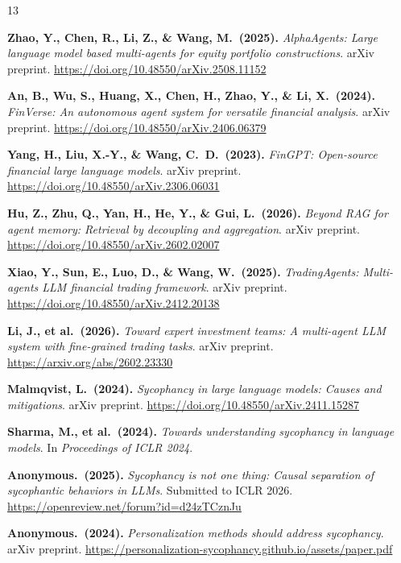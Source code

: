 \documentclass[11pt,a4paper]{article}
\begin{document}
\begin{thebibliography}{13}

\textbf{Zhao, Y., Chen, R., Li, Z., \& Wang, M.\ (2025).}
\textit{AlphaAgents: Large language model based multi-agents for equity portfolio constructions}.
arXiv preprint. \url{https://doi.org/10.48550/arXiv.2508.11152}

\textbf{An, B., Wu, S., Huang, X., Chen, H., Zhao, Y., \& Li, X.\ (2024).}
\textit{FinVerse: An autonomous agent system for versatile financial analysis}.
arXiv preprint. \url{https://doi.org/10.48550/arXiv.2406.06379}

\textbf{Yang, H., Liu, X.-Y., \& Wang, C.~D.\ (2023).}
\textit{FinGPT: Open-source financial large language models}.
arXiv preprint. \url{https://doi.org/10.48550/arXiv.2306.06031}

\textbf{Hu, Z., Zhu, Q., Yan, H., He, Y., \& Gui, L.\ (2026).}
\textit{Beyond RAG for agent memory: Retrieval by decoupling and aggregation}.
arXiv preprint. \url{https://doi.org/10.48550/arXiv.2602.02007}

\textbf{Xiao, Y., Sun, E., Luo, D., \& Wang, W.\ (2025).}
\textit{TradingAgents: Multi-agents LLM financial trading framework}.
arXiv preprint. \url{https://doi.org/10.48550/arXiv.2412.20138}

\textbf{Li, J., et al.\ (2026).}
\textit{Toward expert investment teams: A multi-agent LLM system with fine-grained trading tasks}.
arXiv preprint. \url{https://arxiv.org/abs/2602.23330}

\textbf{Malmqvist, L.\ (2024).}
\textit{Sycophancy in large language models: Causes and mitigations}.
arXiv preprint. \url{https://doi.org/10.48550/arXiv.2411.15287}

\textbf{Sharma, M., et al.\ (2024).}
\textit{Towards understanding sycophancy in language models}.
In \textit{Proceedings of ICLR 2024}.

\textbf{Anonymous.\ (2025).}
\textit{Sycophancy is not one thing: Causal separation of sycophantic behaviors in LLMs}.
Submitted to ICLR 2026. \url{https://openreview.net/forum?id=d24zTCznJu}

\textbf{Anonymous.\ (2024).}
\textit{Personalization methods should address sycophancy}.
arXiv preprint. \url{https://personalization-sycophancy.github.io/assets/paper.pdf}


\end{thebibliography}
\end{document}

